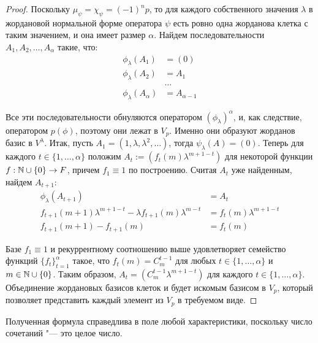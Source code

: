 \begin{proof}
	Поскольку $\mu_\psi = \chi_\psi = (-1)^np$, то для каждого собственного значения $\lambda$ в жордановой нормальной форме оператора $\psi$ есть ровно одна жорданова клетка с таким значением, и она имеет размер $\alpha$. Найдем последовательности $A_1, A_2, \dots, A_\alpha$ такие, что:
	\begin{align*}
		\phi_\lambda(A_1) &= (0)\\
		\phi_\lambda(A_2) &= A_1\\
		&\dotsc\\
		\phi_\lambda(A_{\alpha}) &=  A_{\alpha - 1}
	\end{align*}
	
	Все эти последовательности обнуляются оператором $(\phi_\lambda)^\alpha$, и, как следствие, оператором $p(\phi)$, поэтому они лежат в $V_p$. Именно они образуют жорданов базис в $V^\lambda$. Итак, пусть $A_1 = (1, \lambda, \lambda^2, \dots)$, тогда $\psi_\lambda(A) = (0)$. Теперь для каждого $t \in \{1, \dots, \alpha\}$ положим $A_t := \left(f_t(m)\lambda^{m + 1 - t}\right)$ для некоторой функции $f: \mathbb{N} \cup \{0\} \to F$, причем $f_1 \equiv 1$ по построению. Считая $A_t$ уже найденным, найдем $A_{t + 1}$:
	\begin{align*}
		\phi_\lambda(A_{t + 1}) &= A_t\\
		f_{t + 1}(m + 1)\lambda^{m + 1 - t} - \lambda f_{t + 1}(m)\lambda^{m - t} &= f_t(m)\lambda^{m + 1 - t}\\
		f_{t + 1}(m + 1) - f_{t + 1}(m) &= f_t(m)
	\end{align*}
	
	Базе $f_1 \equiv 1$ и рекуррентному соотношению выше удовлетворяет семейство функций $\{f_t\}_{t = 1}^\alpha$ такое, что $f_t(m) = C_{m}^{t - 1}$ для любых $t \in \{1, \dotsc, \alpha\}$ и $m \in \mathbb{N} \cup \{0\}$. Таким образом, $A_t = (C_m^{t - 1}\lambda^{m + 1 - t})$ для каждого $t \in \{1, \dotsc, \alpha\}$. Объединение жордановых базисов клеток и будет искомым базисом в $V_p$, который позволяет представить каждый элемент из $V_p$ в требуемом виде.
\end{proof}

\begin{note}
	Полученная формула справедлива в поле любой характеристики, поскольку число сочетаний "--- это целое число.
\end{note}